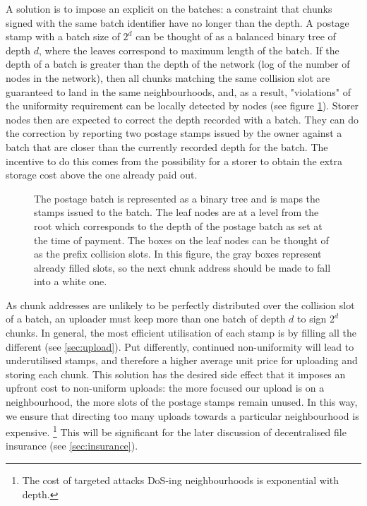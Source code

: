 A solution is to impose an explicit  on the batches: a constraint that chunks signed with the same batch identifier have no  longer than the depth. A postage stamp with a batch size of $2^d$ can be thought of as a balanced binary tree of depth $d$, where the leaves correspond to maximum length  of the batch. If the depth of a batch is greater than the depth of the network (log of the number of nodes in the network), then all chunks matching the same collision slot are guaranteed to land in the same neighbourhoods, and, as a result, "violations" of the uniformity requirement can be locally detected by nodes (see figure \ref{fig:prefix-collision}). 
Storer nodes then are expected to  correct the depth recorded with a batch.
They can do the correction by reporting two postage stamps issued by the owner against a batch that are closer than the currently recorded depth for the batch.
The incentive to do this comes from the possibility for a storer to obtain the extra storage cost above the one already paid out.


\begin{figure}[htbp]
  \centering
    \caption[Limiting the size of a postage stamp \statusgreen]{The postage batch is represented as a binary tree and is maps the stamps issued to the batch.  The leaf nodes are at a level from the root which corresponds to the depth of the postage batch as set at the time of payment. The boxes on the leaf nodes can be thought of as the prefix collision slots. In this figure, the gray boxes represent already filled slots, so the next chunk address should be made to fall into a white one.}
  \label{fig:prefix-collision}
\end{figure}


As chunk addresses are unlikely to be perfectly distributed over the collision slot of a batch, an uploader must keep more than one batch of depth $d$ to sign $2^d$ chunks. In general, the most efficient utilisation of each stamp is by filling all the different  (see \ref{sec:upload}). Put differently, continued non-uniformity will lead to underutilised stamps, and therefore a higher average unit price for uploading and storing each chunk. This solution has the desired side effect that it imposes an upfront cost to non-uniform uploads: the more focused our upload is on a neighbourhood, the more slots of the postage stamps remain unused. In this way, we ensure that directing too many uploads towards a particular neighbourhood is expensive.%
%
\footnote{The cost of targeted attacks DoS-ing neighbourhoods is exponential with depth.}
%
This will be significant for the later discussion of decentralised file insurance (see \ref{sec:insurance}). 


